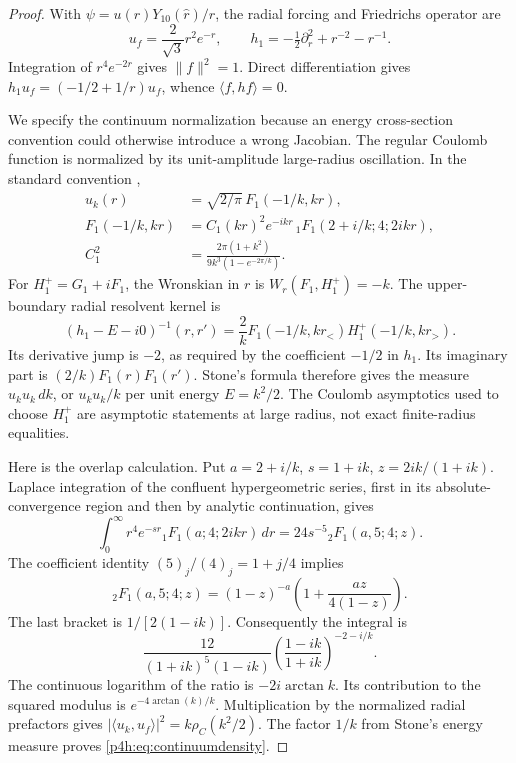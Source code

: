 \documentclass[11pt]{article}
\numberwithin{equation}{section}
\theoremstyle{definition}
\theoremstyle{remark}
\begin{document}
\begin{proof}
With $\psi=u(r)Y_{10}(\widehat r)/r$, the radial forcing and
Friedrichs operator are
\[
 u_f=\frac2{\sqrt3}r^2e^{-r},\qquad
 h_1=-\tfrac12\partial_r^2+r^{-2}-r^{-1}.
\]
Integration of $r^4e^{-2r}$ gives $\|f\|^2=1$.
Direct differentiation gives
$h_1u_f=(-1/2+1/r)u_f$, whence $\langle f,hf\rangle=0$.

We specify the continuum normalization because an energy
cross-section convention could otherwise introduce a wrong Jacobian.
The regular Coulomb function is normalized by its unit-amplitude
large-radius oscillation. In the standard convention
\cite{DLMFCoulomb},
\begin{align*}
 u_k(r)&=\sqrt{2/\pi}\,F_1(-1/k,kr),\\
 F_1(-1/k,kr)&=C_1(kr)^2e^{-ikr}\,
                    {}_1F_1(2+i/k;4;2ikr),\\
 C_1^2&=\frac{2\pi(1+k^2)}
                  {9k^3(1-e^{-2\pi/k})}.
\end{align*}
For $H_1^+=G_1+iF_1$, the Wronskian in $r$ is
$W_r(F_1,H_1^+)=-k$. The upper-boundary radial resolvent kernel is
\begin{equation}\label{p4h:eq:Green}
 (h_1-E-i0)^{-1}(r,r')
   =\frac2k F_1(-1/k,kr_<)H_1^+(-1/k,kr_>).
\end{equation}
Its derivative jump is $-2$, as required by the coefficient
$-1/2$ in $h_1$. Its imaginary part is $(2/k)F_1(r)F_1(r')$.
Stone's formula therefore gives the measure $u_ku_k\,dk$,
or $u_ku_k/k$ per unit energy $E=k^2/2$.
The Coulomb asymptotics used to choose $H_1^+$ are asymptotic
statements at large radius, not exact finite-radius equalities.

Here is the overlap calculation. Put
$a=2+i/k$, $s=1+ik$, $z=2ik/(1+ik)$.
Laplace integration of the confluent hypergeometric series,
first in its absolute-convergence region and then by analytic
continuation, gives
\[
 \int_0^\infty r^4e^{-sr}{}_1F_1(a;4;2ikr)\,dr
       =24s^{-5}{}_2F_1(a,5;4;z).
\]
The coefficient identity $(5)_j/(4)_j=1+j/4$ implies
\[
 {}_2F_1(a,5;4;z)
 =(1-z)^{-a}\left(1+\frac{az}{4(1-z)}\right).
\]
The last bracket is $1/[2(1-ik)]$. Consequently the integral is
\[
 \frac{12}{(1+ik)^5(1-ik)}
       \left(\frac{1-ik}{1+ik}\right)^{-2-i/k}.
\]
The continuous logarithm of the ratio is $-2i\arctan k$.
Its contribution to the squared modulus is
$e^{-4\arctan(k)/k}$. Multiplication by the normalized radial
prefactors gives
$|\langle u_k,u_f\rangle|^2=k\rho_C(k^2/2)$.
The factor $1/k$ from Stone's energy measure proves
\eqref{p4h:eq:continuumdensity}.


\end{proof}
\end{document}
